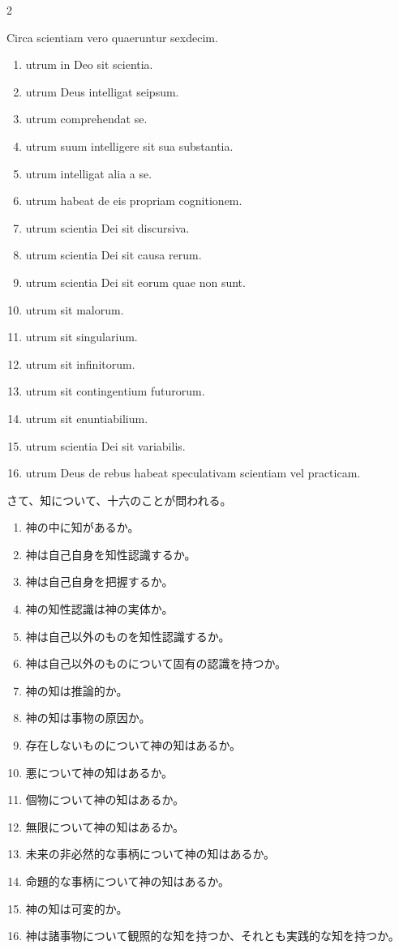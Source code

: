 \documentclass[paper=a4paper,fontsize=10pt,jafontsize=9pt,titlepage]{jlreq}
\begin{document}
\begin{paracol}{2}

Circa scientiam vero quaeruntur sexdecim. 
\begin{enumerate}
 \item utrum in Deo sit scientia.
 \item utrum Deus intelligat seipsum.
 \item utrum comprehendat se.
 \item utrum suum intelligere sit sua substantia.
 \item utrum intelligat alia a se.
 \item utrum habeat de eis propriam cognitionem. 
 \item utrum scientia Dei sit discursiva.
 \item utrum scientia Dei sit causa rerum.
 \item utrum scientia Dei sit eorum quae non sunt.
 \item utrum sit malorum.
 \item utrum sit singularium.
 \item utrum sit infinitorum.
 \item utrum sit contingentium futurorum.
 \item utrum sit enuntiabilium.
 \item utrum scientia Dei sit variabilis.
 \item utrum Deus de rebus habeat speculativam scientiam vel practicam. 
\end{enumerate}

\switchcolumn

さて、知について、十六のことが問われる。
\begin{enumerate}
 \item 神の中に知があるか。
 \item 神は自己自身を知性認識するか。
 \item 神は自己自身を把握するか。
 \item 神の知性認識は神の実体か。
 \item 神は自己以外のものを知性認識するか。
 \item 神は自己以外のものについて固有の認識を持つか。
 \item 神の知は推論的か。
 \item 神の知は事物の原因か。
 \item 存在しないものについて神の知はあるか。
 \item 悪について神の知はあるか。
 \item 個物について神の知はあるか。
 \item 無限について神の知はあるか。
 \item 未来の非必然的な事柄について神の知はあるか。
 \item 命題的な事柄について神の知はあるか。
 \item 神の知は可変的か。
 \item 神は諸事物について観照的な知を持つか、それとも実践的な知を持つか。
\end{enumerate}

\end{paracol}
\end{document}
